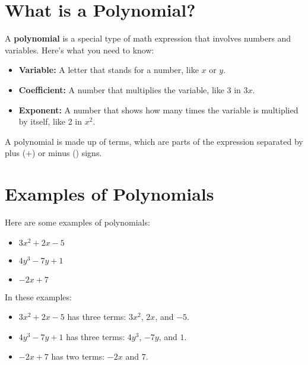 \section{What is a Polynomial?}

A \textbf{polynomial} is a special type of math expression that involves numbers and variables. Here’s what you need to know:

\begin{itemize}
    \item \textbf{Variable:} A letter that stands for a number, like \( x \) or \( y \).
    \item \textbf{Coefficient:} A number that multiplies the variable, like 3 in \( 3x \).
    \item \textbf{Exponent:} A number that shows how many times the variable is multiplied by itself, like 2 in \( x^2 \).
\end{itemize}

A polynomial is made up of terms, which are parts of the expression separated by plus (+) or minus (\textminus) signs.

\section{Examples of Polynomials}

Here are some examples of polynomials:

\begin{itemize}
    \item \( 3x^2 + 2x - 5 \)
    \item \( 4y^3 - 7y + 1 \)
    \item \( -2x + 7 \)
\end{itemize}

In these examples:

\begin{itemize}
    \item \( 3x^2 + 2x - 5 \) has three terms: \( 3x^2 \), \( 2x \), and \( -5 \).
    \item \( 4y^3 - 7y + 1 \) has three terms: \( 4y^3 \), \( -7y \), and \( 1 \).
    \item \( -2x + 7 \) has two terms: \( -2x \) and \( 7 \).
\end{itemize}
